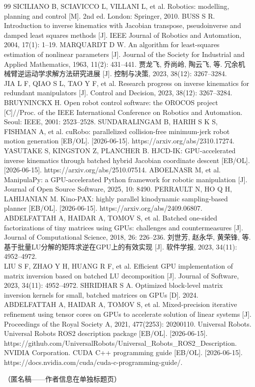 \documentclass[twocolumn,a4paper,10pt]{ctexart}
\begin{document}
\newpage
\begin{thebibliography}{99}
 SICILIANO B, SCIAVICCO L, VILLANI L, et al. Robotics: modelling, planning and control [M]. 2nd ed. London: Springer, 2010.
 BUSS S R. Introduction to inverse kinematics with Jacobian transpose, pseudoinverse and damped least squares methods [J]. IEEE Journal of Robotics and Automation, 2004, 17(1): 1--19.
 MARQUARDT D W. An algorithm for least-squares estimation of nonlinear parameters [J]. Journal of the Society for Industrial and Applied Mathematics, 1963, 11(2): 431--441.
 贾龙飞, 乔尚岭, 陶云飞, 等. 冗余机械臂逆运动学求解方法研究进展 [J]. 控制与决策, 2023, 38(12): 3267--3284.\\
JIA L F, QIAO S L, TAO Y F, et al. Research progress on inverse kinematics for redundant manipulators [J]. Control and Decision, 2023, 38(12): 3267--3284.
 BRUYNINCKX H. Open robot control software: the OROCOS project [C]//Proc. of the IEEE International Conference on Robotics and Automation. Seoul: IEEE, 2001: 2523--2528.
 SUNDARALINGAM B, HARIH S K S, FISHMAN A, et al. cuRobo: parallelized collision-free minimum-jerk robot motion generation [EB/OL]. [2026-06-15]. https://arxiv.org/abs/2310.17274.
 YASUTAKE S, KINGSTON Z, PLANCHER B. HJCD-IK: GPU-accelerated inverse kinematics through batched hybrid Jacobian coordinate descent [EB/OL]. [2026-06-15]. https://arxiv.org/abs/2510.07514.
 ABOELNASR M, et al. ManipulaPy: a GPU-accelerated Python framework for robotic manipulation [J]. Journal of Open Source Software, 2025, 10: 8490.
 PERRAULT N, HO Q H, LAHIJANIAN M. Kino-PAX: highly parallel kinodynamic sampling-based planner [EB/OL]. [2026-06-15]. https://arxiv.org/abs/2409.06807.
 ABDELFATTAH A, HAIDAR A, TOMOV S, et al. Batched one-sided factorizations of tiny matrices using GPUs: challenges and countermeasures [J]. Journal of Computational Science, 2018, 26: 226--236.
 刘世芳, 赵永华, 黄荣锋, 等. 基于批量LU分解的矩阵求逆在GPU上的有效实现 [J]. 软件学报, 2023, 34(11): 4952--4972.\\
LIU S F, ZHAO Y H, HUANG R F, et al. Efficient GPU implementation of matrix inversion based on batched LU decomposition [J]. Journal of Software, 2023, 34(11): 4952--4972.
 SHRIDHAR S A. Optimized block-level matrix inversion kernels for small, batched matrices on GPUs [D]. 2024.
 ABDELFATTAH A, HAIDAR A, TOMOV S, et al. Mixed-precision iterative refinement using tensor cores on GPUs to accelerate solution of linear systems [J]. Proceedings of the Royal Society A, 2021, 477(2253): 20200110.
 Universal Robots. Universal Robots ROS2 description package [EB/OL]. [2026-06-15]. https://github.com/UniversalRobots/Universal\_Robots\_ROS2\_Description.
 NVIDIA Corporation. CUDA C++ programming guide [EB/OL]. [2026-06-15]. https://docs.nvidia.com/cuda/cuda-c-programming-guide/.
\end{thebibliography}

\vspace{5mm}

\vspace{2mm}
\noindent （匿名稿——作者信息在单独标题页）\\
\end{document}

